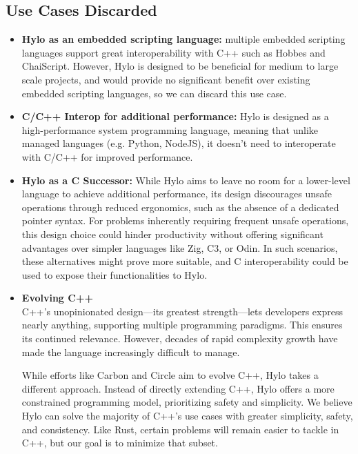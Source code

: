\subsection{Use Cases Discarded}
\begin{itemize}
  \item \textbf{Hylo as an embedded scripting language:} multiple embedded scripting languages support great interoperability with C++ such as Hobbes and ChaiScript. %
  However, Hylo is designed to be beneficial for medium to large scale projects, and would provide no significant benefit over existing embedded scripting languages, so we can discard this use case.
  \item \textbf{C/C++ Interop for additional performance:} Hylo is designed as a high-performance system programming language, meaning that unlike managed languages (e.g. Python, NodeJS), it doesn't need to interoperate with C/C++ for improved performance.
  \item \textbf{Hylo as a C Successor:} While Hylo aims to leave no room for a lower-level language to achieve additional performance, its design discourages unsafe operations through reduced ergonomics, such as the absence of a dedicated pointer syntax. For problems inherently requiring frequent unsafe operations, this design choice could hinder productivity without offering significant advantages over simpler languages like Zig, C3, or Odin. In such scenarios, these alternatives might prove more suitable, and C interoperability could be used to expose their functionalities to Hylo.

\item \textbf{Evolving C++}\\
  C++'s unopinionated design—its greatest strength—lets developers express nearly anything, supporting multiple programming paradigms. This ensures its continued relevance. However, decades of rapid complexity growth have made the language increasingly difficult to manage.

  While efforts like Carbon and Circle aim to evolve C++, Hylo takes a different approach. Instead of directly extending C++, Hylo offers a more constrained programming model, prioritizing safety and simplicity. We believe Hylo can solve the majority of C++'s use cases with greater simplicity, safety, and consistency. Like Rust, certain problems will remain easier to tackle in C++, but our goal is to minimize that subset.
\end{itemize}


